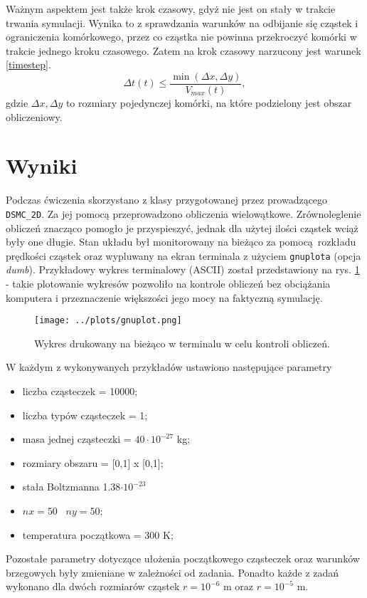 \documentclass[a4paper, 12pt]{article}
\begin{document}
	Ważnym aspektem jest także krok czasowy, gdyż nie jest on stały w trakcie trwania symulacji.
	Wynika to z sprawdzania warunków na odbijanie się cząstek i ograniczenia komórkowego, przez co cząstka nie powinna przekroczyć komórki w trakcie jednego kroku czasowego.
	Zatem na krok czasowy narzucony jest warunek \eqref{timestep}.
	\begin{equation}
		\Delta t (t) \leq \frac{\min(\Delta x, \Delta y)}{V_{max}(t)},
		\label{timestep}
	\end{equation} 
	gdzie $\Delta x, \Delta y$ to rozmiary pojedynczej komórki, na które podzielony jest obszar obliczeniowy.
	
	\section*{Wyniki}
	
	Podczas ćwiczenia skorzystano z klasy przygotowanej przez prowadzącego \texttt{DSMC\_2D}.
	Za jej pomocą przeprowadzono obliczenia wielowątkowe.
	Zrównoleglenie obliczeń znacząco pomogło je przyspieszyć, jednak dla użytej ilości cząstek wciąż były one długie. 
	Stan układu był monitorowany na bieżąco za pomocą rozkładu prędkości cząstek oraz wypluwany na ekran terminala z użyciem \texttt{gnuplota} (opcja \textit{dumb}).
	Przykładowy wykres terminalowy (ASCII) został przedstawiony na rys. \ref{gnuplot_plot} - takie plotowanie wykresów pozwoliło na kontrole obliczeń bez obciążania komputera i przeznaczenie większości jego mocy na faktyczną symulację.
	\begin{figure}[H]
		\centering
		\texttt{[image: ../plots/gnuplot.png]}
		\caption{Wykres drukowany na bieżąco w terminalu w celu kontroli obliczeń.}
		\label{gnuplot_plot}
	\end{figure} 
	
	\noindent W każdym z wykonywanych przykładów ustawiono następujące parametry
	\begin{itemize}
		\item liczba cząsteczek = 10000;
		\item liczba typów cząsteczek = 1;
		\item masa jednej cząsteczki = $40\cdot10^{-27}$ kg;
		\item rozmiary obszaru = [0,1] x [0,1];
		\item stała Boltzmanna 1.38$\cdot10^{-23}$
		\item $nx = 50 \; \; \; ny = 50$;
		\item temperatura początkowa = 300 K;
	\end{itemize}
	Pozostałe parametry dotyczące ułożenia początkowego cząsteczek oraz warunków brzegowych były zmieniane w zależności od zadania.
	Ponadto każde z zadań wykonano dla dwóch rozmiarów cząstek $r = 10^{-6}$ m oraz $r = 10^{-5}$ m.
	
\end{document}
